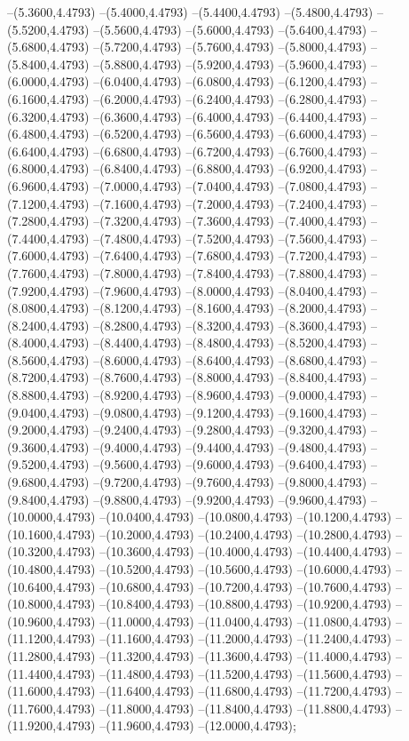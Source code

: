{	--(5.3600,4.4793)
	--(5.4000,4.4793)
	--(5.4400,4.4793)
	--(5.4800,4.4793)
	--(5.5200,4.4793)
	--(5.5600,4.4793)
	--(5.6000,4.4793)
	--(5.6400,4.4793)
	--(5.6800,4.4793)
	--(5.7200,4.4793)
	--(5.7600,4.4793)
	--(5.8000,4.4793)
	--(5.8400,4.4793)
	--(5.8800,4.4793)
	--(5.9200,4.4793)
	--(5.9600,4.4793)
	--(6.0000,4.4793)
	--(6.0400,4.4793)
	--(6.0800,4.4793)
	--(6.1200,4.4793)
	--(6.1600,4.4793)
	--(6.2000,4.4793)
	--(6.2400,4.4793)
	--(6.2800,4.4793)
	--(6.3200,4.4793)
	--(6.3600,4.4793)
	--(6.4000,4.4793)
	--(6.4400,4.4793)
	--(6.4800,4.4793)
	--(6.5200,4.4793)
	--(6.5600,4.4793)
	--(6.6000,4.4793)
	--(6.6400,4.4793)
	--(6.6800,4.4793)
	--(6.7200,4.4793)
	--(6.7600,4.4793)
	--(6.8000,4.4793)
	--(6.8400,4.4793)
	--(6.8800,4.4793)
	--(6.9200,4.4793)
	--(6.9600,4.4793)
	--(7.0000,4.4793)
	--(7.0400,4.4793)
	--(7.0800,4.4793)
	--(7.1200,4.4793)
	--(7.1600,4.4793)
	--(7.2000,4.4793)
	--(7.2400,4.4793)
	--(7.2800,4.4793)
	--(7.3200,4.4793)
	--(7.3600,4.4793)
	--(7.4000,4.4793)
	--(7.4400,4.4793)
	--(7.4800,4.4793)
	--(7.5200,4.4793)
	--(7.5600,4.4793)
	--(7.6000,4.4793)
	--(7.6400,4.4793)
	--(7.6800,4.4793)
	--(7.7200,4.4793)
	--(7.7600,4.4793)
	--(7.8000,4.4793)
	--(7.8400,4.4793)
	--(7.8800,4.4793)
	--(7.9200,4.4793)
	--(7.9600,4.4793)
	--(8.0000,4.4793)
	--(8.0400,4.4793)
	--(8.0800,4.4793)
	--(8.1200,4.4793)
	--(8.1600,4.4793)
	--(8.2000,4.4793)
	--(8.2400,4.4793)
	--(8.2800,4.4793)
	--(8.3200,4.4793)
	--(8.3600,4.4793)
	--(8.4000,4.4793)
	--(8.4400,4.4793)
	--(8.4800,4.4793)
	--(8.5200,4.4793)
	--(8.5600,4.4793)
	--(8.6000,4.4793)
	--(8.6400,4.4793)
	--(8.6800,4.4793)
	--(8.7200,4.4793)
	--(8.7600,4.4793)
	--(8.8000,4.4793)
	--(8.8400,4.4793)
	--(8.8800,4.4793)
	--(8.9200,4.4793)
	--(8.9600,4.4793)
	--(9.0000,4.4793)
	--(9.0400,4.4793)
	--(9.0800,4.4793)
	--(9.1200,4.4793)
	--(9.1600,4.4793)
	--(9.2000,4.4793)
	--(9.2400,4.4793)
	--(9.2800,4.4793)
	--(9.3200,4.4793)
	--(9.3600,4.4793)
	--(9.4000,4.4793)
	--(9.4400,4.4793)
	--(9.4800,4.4793)
	--(9.5200,4.4793)
	--(9.5600,4.4793)
	--(9.6000,4.4793)
	--(9.6400,4.4793)
	--(9.6800,4.4793)
	--(9.7200,4.4793)
	--(9.7600,4.4793)
	--(9.8000,4.4793)
	--(9.8400,4.4793)
	--(9.8800,4.4793)
	--(9.9200,4.4793)
	--(9.9600,4.4793)
	--(10.0000,4.4793)
	--(10.0400,4.4793)
	--(10.0800,4.4793)
	--(10.1200,4.4793)
	--(10.1600,4.4793)
	--(10.2000,4.4793)
	--(10.2400,4.4793)
	--(10.2800,4.4793)
	--(10.3200,4.4793)
	--(10.3600,4.4793)
	--(10.4000,4.4793)
	--(10.4400,4.4793)
	--(10.4800,4.4793)
	--(10.5200,4.4793)
	--(10.5600,4.4793)
	--(10.6000,4.4793)
	--(10.6400,4.4793)
	--(10.6800,4.4793)
	--(10.7200,4.4793)
	--(10.7600,4.4793)
	--(10.8000,4.4793)
	--(10.8400,4.4793)
	--(10.8800,4.4793)
	--(10.9200,4.4793)
	--(10.9600,4.4793)
	--(11.0000,4.4793)
	--(11.0400,4.4793)
	--(11.0800,4.4793)
	--(11.1200,4.4793)
	--(11.1600,4.4793)
	--(11.2000,4.4793)
	--(11.2400,4.4793)
	--(11.2800,4.4793)
	--(11.3200,4.4793)
	--(11.3600,4.4793)
	--(11.4000,4.4793)
	--(11.4400,4.4793)
	--(11.4800,4.4793)
	--(11.5200,4.4793)
	--(11.5600,4.4793)
	--(11.6000,4.4793)
	--(11.6400,4.4793)
	--(11.6800,4.4793)
	--(11.7200,4.4793)
	--(11.7600,4.4793)
	--(11.8000,4.4793)
	--(11.8400,4.4793)
	--(11.8800,4.4793)
	--(11.9200,4.4793)
	--(11.9600,4.4793)
	--(12.0000,4.4793);
}
